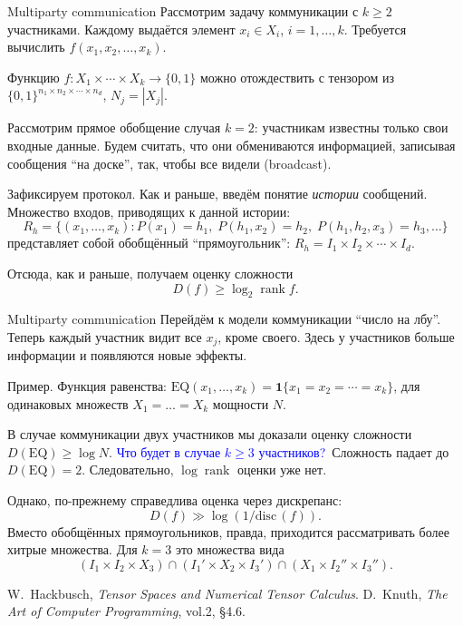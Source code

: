 \documentclass[handout]{beamer}
\renewcommand\ge{\geqslant}
\DeclareMathOperator{\rank}{rank}
\begin{document}
\begin{frame}{Multiparty communication}
    Рассмотрим задачу коммуникации с $k\ge 2$ участниками.
    Каждому выдаётся элемент $x_i\in X_i$, $i=1,\ldots,k$. Требуется вычислить
    $f(x_1,x_2,\ldots,x_k)$.
    \pause

    Функцию
    $f\colon X_1\times\cdots\times X_k\to \{0,1\}$ можно отождествить с тензором
    из $\{0,1\}^{n_1\times n_2\times\cdots\times n_d}$, $N_j = |X_j|$.
    \pause

    Рассмотрим прямое обобщение случая $k=2$: участникам известны только свои
    входные данные. Будем считать, что они обмениваются информацией, записывая
    сообщения ``на доске'', так, чтобы все видели (broadcast).
    \pause
    
    Зафиксируем протокол. Как и раньше, введём понятие \textit{истории}
    сообщений. Множество входов, приводящих к данной истории:
    $$
    R_h = \{(x_1,\ldots,x_k)\colon
    P(x_1)=h_1,\;P(h_1,x_2)=h_2,\;P(h_1,h_2,x_3)=h_3,\ldots\}
    $$
    представляет собой обобщённый ``прямоугольник'': $R_h = I_1\times
    I_2\times\cdots\times I_d$. 
    \pause

    Отсюда, как и раньше, получаем оценку сложности
    $$
    D(f)\ge\log_2\rank f.
    $$
\end{frame}

\begin{frame}{Multiparty communication}
    Перейдём к модели коммуникации ``число на лбу''. Теперь каждый участник
    видит все $x_j$, кроме своего. Здесь у участников больше информации и
    появляются новые эффекты.
    \pause
    
    Пример. Функция равенства:
    $\mathrm{EQ}(x_1,\ldots,x_k)=\mathbf{1}\{x_1=x_2=\cdots=x_k\}$, для
    одинаковых множеств $X_1=\ldots=X_k$ мощности $N$.
    \pause

    В случае коммуникации двух участников мы доказали оценку сложности
    $D(\mathrm{EQ})\ge\log N$. \textcolor{blue}{Что будет в случае $k\ge 3$
    участников?}\pause~Сложность падает до $D(\mathrm{EQ})=2$. Следовательно,
    $\log\rank$ оценки уже нет.
    \pause\vspace{5pt}

    Однако, по-прежнему справедлива оценка через дискрепанс:
    $$
    D(f) \gg \log(1/\mathrm{disc}\,(f)).
    $$
    Вместо обобщённых прямоугольников, правда, приходится рассматривать более
    хитрые множества. Для $k=3$ это множества вида
    $$
    (I_1\times I_2\times X_3)\cap (I_1'\times X_2\times I_3')\cap (X_1\times
    I_2''\times I_3'').
    $$

\end{frame}

\begin{frame}
    \begin{thebibliography}{XXXX}
            W.~Hackbusch, \textit{Tensor Spaces and Numerical Tensor Calculus}.
            D.~Knuth, \textit{The Art of Computer Programming}, vol.2, \S4.6.
    \end{thebibliography}
\end{frame}
\end{document}
